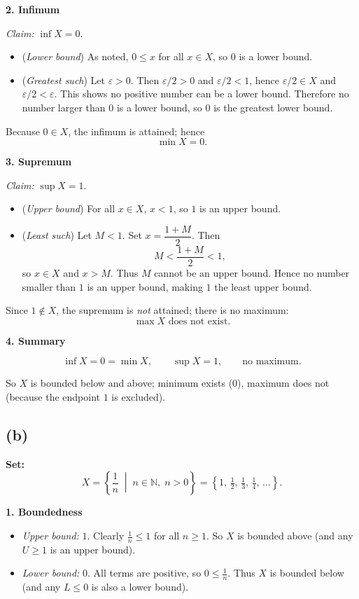 \documentclass[12pt,a4paper]{article}
\theoremstyle{definition}
\theoremstyle{remark}
\begin{document}
\textbf{2. Infimum}

\emph{Claim:} $\inf X = 0$.

\begin{itemize}
    \item (\emph{Lower bound}) As noted, $0\le x$ for all $x\in X$, so $0$ is a lower bound.
    \item (\emph{Greatest such}) Let $\varepsilon>0$. Then $\varepsilon/2 >0$ and $\varepsilon/2 < 1$, hence $\varepsilon/2\in X$ and $\varepsilon/2 < \varepsilon$. This shows no positive number can be a lower bound. Therefore no number larger than $0$ is a lower bound, so $0$ is the greatest lower bound.
\end{itemize}
Because $0\in X$, the infimum is attained; hence
\[
\min X = 0.
\]

\textbf{3. Supremum}

\emph{Claim:} $\sup X = 1$.

\begin{itemize}
    \item (\emph{Upper bound}) For all $x\in X$, $x<1$, so $1$ is an upper bound.
    \item (\emph{Least such}) Let $M<1$. Set $x=\dfrac{1+M}{2}$. Then
    \[
    M < \frac{1+M}{2} < 1,
    \]
    so $x\in X$ and $x>M$. Thus $M$ cannot be an upper bound. Hence no number smaller than $1$ is an upper bound, making $1$ the least upper bound.
\end{itemize}
Since $1\notin X$, the supremum is \emph{not} attained; there is no maximum:
\[
\max X \text{ does not exist.}
\]

\textbf{4. Summary}

\[
\inf X = 0 = \min X,\qquad \sup X = 1,\qquad \text{no maximum.}
\]

So $X$ is bounded below and above; minimum exists ($0$), maximum does not (because the endpoint $1$ is excluded).

\subsection*{(b)}

\textbf{Set:}
\[
X = \left\{ \frac{1}{n} \;\middle|\; n \in \mathbb{N},\; n > 0 \right\} = \left\{ 1,\, \tfrac{1}{2},\, \tfrac{1}{3},\, \tfrac{1}{4},\, \dots \right\}.
\]

\textbf{1. Boundedness}

\begin{itemize}
    \item \emph{Upper bound:} $1$. Clearly $\frac{1}{n} \le 1$ for all $n \ge 1$. So $X$ is bounded above (and any $U \ge 1$ is an upper bound).
    \item \emph{Lower bound:} $0$. All terms are positive, so $0 \le \frac{1}{n}$. Thus $X$ is bounded below (and any $L \le 0$ is also a lower bound).
\end{itemize}
\end{document}
